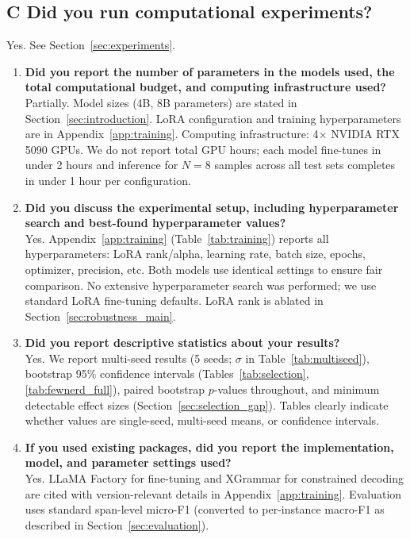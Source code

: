 \subsection*{C\hspace{0.5em} Did you run computational experiments?}

Yes. See Section~\ref{sec:experiments}.

\begin{enumerate}
\item[C1.] \textbf{Did you report the number of parameters in the models used, the total computational budget, and computing infrastructure used?}\\
Partially. Model sizes (4B, 8B parameters) are stated in Section~\ref{sec:introduction}. LoRA configuration and training hyperparameters are in Appendix~\ref{app:training}. Computing infrastructure: 4$\times$ NVIDIA RTX 5090 GPUs. We do not report total GPU hours; each model fine-tunes in under 2 hours and inference for $N{=}8$ samples across all test sets completes in under 1 hour per configuration.

\item[C2.] \textbf{Did you discuss the experimental setup, including hyperparameter search and best-found hyperparameter values?}\\
Yes. Appendix~\ref{app:training} (Table~\ref{tab:training}) reports all hyperparameters: LoRA rank/alpha, learning rate, batch size, epochs, optimizer, precision, etc. Both models use identical settings to ensure fair comparison. No extensive hyperparameter search was performed; we use standard LoRA fine-tuning defaults. LoRA rank is ablated in Section~\ref{sec:robustness_main}.

\item[C3.] \textbf{Did you report descriptive statistics about your results?}\\
Yes. We report multi-seed results (5 seeds; $\sigma$ in Table~\ref{tab:multiseed}), bootstrap 95\% confidence intervals (Tables~\ref{tab:selection}, \ref{tab:fewnerd_full}), paired bootstrap $p$-values throughout, and minimum detectable effect sizes (Section~\ref{sec:selection_gap}). Tables clearly indicate whether values are single-seed, multi-seed means, or confidence intervals.

\item[C4.] \textbf{If you used existing packages, did you report the implementation, model, and parameter settings used?}\\
Yes. LLaMA Factory \cite{zheng2024llamafactory} for fine-tuning and XGrammar \cite{dong2024xgrammar} for constrained decoding are cited with version-relevant details in Appendix~\ref{app:training}. Evaluation uses standard span-level micro-F1 (converted to per-instance macro-F1 as described in Section~\ref{sec:evaluation}).
\end{enumerate}

